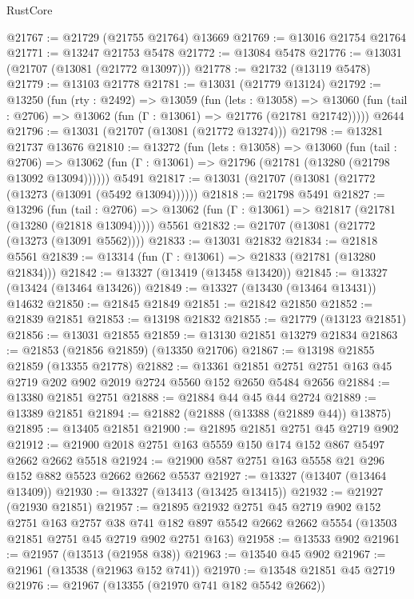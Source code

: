 \begin{lexlean}{RustCore}
\begin{coremodule}
@21767 := @21729 (@21755 @21764) @13669
@21769 := @13016 @21754 @21764
@21771 := @13247 @21753 @5478
@21772 := @13084 @5478
@21776 := @13031 (@21707 (@13081 (@21772 @13097)))
@21778 := @21732 (@13119 @5478)
@21779 := @13103 @21778
@21781 := @13031 (@21779 @13124)
@21792 := @13250
    (fun (rty : @2492) =>
    @13059
      (fun (lets : @13058) =>
      @13060 (fun (tail : @2706) => @13062 (fun (Γ : @13061) => @21776 (@21781 @21742)))))
    @2644
@21796 := @13031 (@21707 (@13081 (@21772 @13274)))
@21798 := @13281 @21737 @13676
@21810 := @13272
    (fun (lets : @13058) =>
    @13060
      (fun (tail : @2706) =>
      @13062 (fun (Γ : @13061) => @21796 (@21781 (@13280 (@21798 @13092 @13094))))))
    @5491
@21817 := @13031 (@21707 (@13081 (@21772 (@13273 (@13091 (@5492 @13094))))))
@21818 := @21798 @5491
@21827 := @13296
    (fun (tail : @2706) => @13062 (fun (Γ : @13061) => @21817 (@21781 (@13280 (@21818 @13094)))))
    @5561
@21832 := @21707 (@13081 (@21772 (@13273 (@13091 @5562))))
@21833 := @13031 @21832
@21834 := @21818 @5561
@21839 := @13314 (fun (Γ : @13061) => @21833 (@21781 (@13280 @21834)))
@21842 := @13327 (@13419 (@13458 @13420))
@21845 := @13327 (@13424 (@13464 @13426))
@21849 := @13327 (@13430 (@13464 @13431)) @14632
@21850 := @21845 @21849
@21851 := @21842 @21850
@21852 := @21839 @21851
@21853 := @13198 @21832
@21855 := @21779 (@13123 @21851)
@21856 := @13031 @21855
@21859 := @13130 @21851 @13279 @21834
@21863 := @21853 (@21856 @21859) (@13350 @21706)
@21867 := @13198 @21855 @21859 (@13355 @21778)
@21882 := @13361
    @21851
    @2751
    @2751
    @163
    @45
    @2719
    @202
    @902
    @2019
    @2724
    @5560
    @152
    @2650
    @5484
    @2656
@21884 := @13380 @21851 @2751
@21888 := @21884 @44 @45 @44 @2724
@21889 := @13389 @21851
@21894 := @21882 (@21888 (@13388 (@21889 @44)) @13875)
@21895 := @13405 @21851
@21900 := @21895 @21851 @2751 @45 @2719 @902
@21912 := @21900 @2018 @2751 @163 @5559 @150 @174 @152 @867 @5497 @2662 @2662 @5518
@21924 := @21900 @587 @2751 @163 @5558 @21 @296 @152 @882 @5523 @2662 @2662 @5537
@21927 := @13327 (@13407 (@13464 @13409))
@21930 := @13327 (@13413 (@13425 @13415))
@21932 := @21927 (@21930 @21851)
@21957 := @21895
    @21932
    @2751
    @45
    @2719
    @902
    @152
    @2751
    @163
    @2757
    @38
    @741
    @182
    @897
    @5542
    @2662
    @2662
    @5554
    (@13503 @21851 @2751 @45 @2719 @902 @2751 @163)
@21958 := @13533 @902
@21961 := @21957 (@13513 (@21958 @38))
@21963 := @13540 @45 @902
@21967 := @21961 (@13538 (@21963 @152 @741))
@21970 := @13548 @21851 @45 @2719
@21976 := @21967 (@13355 (@21970 @741 @182 @5542 @2662))

\end{coremodule}
\end{lexlean}
